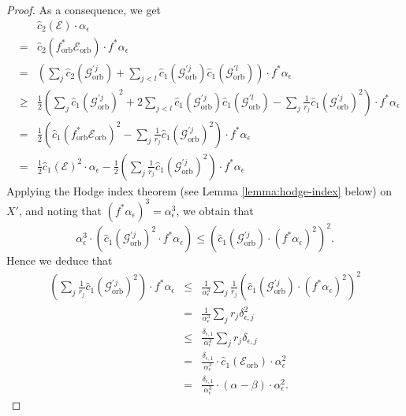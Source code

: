 \documentclass[12pt]{amsart}
\newcommand{\<}{\leq}
\def\>{\geq}
\newcommand{\num}{\equiv}
\def\mcE{\mathcal{E}}
\def\mcG{\mathcal{G}}
\theoremstyle{remark}
\theoremstyle{definition}
\theoremstyle{definition}
\numberwithin{equation}{section}
\theoremstyle{definition}
\theoremstyle{definition}
\def\orb{\mathrm{orb}}
\begin{document}
\begin{proof}
 




As a consequence, we get   
\begin{eqnarray*}
& & \hat{c}_2( \mcE ) \cdot  \alpha_\epsilon  \\
&=& \hat{c}_2(f^*_{\orb}\mcE_{\orb} ) \cdot f^*\alpha_\epsilon  \\
&=& \left(\sum_j \hat{c}_2(\mcG_{\orb}^{'j} ) + \sum_{j<l}\hat{c}_1(\mcG_{\orb}^{'j} ) \hat{c}_1(\mcG_{\orb}^{'l} ) \right)\cdot f^*\alpha_\epsilon   \\
&\> &  \frac{1}{2} \left( \sum_j \hat{c}_1(\mcG_{\orb}^{'j})^2 + 2\sum_{j<l}\hat{c}_1(\mcG_{\orb}^{'j} ) \hat{c}_1(\mcG_{\orb}^{'l} )  
-  \sum_j \frac{1}{r_j}\hat{c}_1(\mcG_{\orb}^{'j} )^2  \right) \cdot f^*\alpha_\epsilon  \\
&=&\frac{1}{2} \left(\hat{c}_1(f_{\orb}^*\mcE_{\orb})^2 -  \sum_j \frac{1}{r_j}\hat{c}_1(\mcG_{\orb}^{'j} )^2 \right) \cdot
f^*\alpha_\epsilon  \\
&=& \frac{1}{2} \hat{c}_1(\mcE)^2 \cdot \alpha_{\epsilon} 
     - \frac{1}{2}\left( \sum_j \frac{1}{r_j}\hat{c}_1(\mcG_{\orb}^{'j} )^2 \right)  
     \cdot  f^*\alpha_\epsilon 
\end{eqnarray*}
Applying the Hodge index theorem (see Lemma \ref{lemma:hodge-index} below) on  $X'$, and noting that $(f^*\alpha_\epsilon)^3= \alpha_\epsilon^3$,  we obtain that  
\[
\alpha_\epsilon^{3} \cdot \left(\hat{c}_1(\mcG_{\orb}^{'j}) ^2 \cdot f^*\alpha_\epsilon  \right) 
\<    \left(\hat{c}_1(\mcG_{\orb}^{'j}) \cdot (f^*\alpha_\epsilon)^{2}\right)^2.
\]
Hence we deduce that 
\begin{eqnarray*}
\left(\sum_j \frac{1}{r_j}\hat{c}_1(\mcG_{\orb}^{'j} )^2 \right)\cdot f^*\alpha_\epsilon 
&\<& \frac{1}{\alpha_\epsilon^3}\sum_j \frac{1}{r_j} \left(\hat{c}_1(\mcG_{\orb}^{'j}) \cdot (f^* \alpha_\epsilon)^{2}\right)^2 \\
&=& \frac{1}{\alpha_\epsilon^3} \sum_j r_j\delta_{\epsilon, j}^2 \\
&\<&   \frac{\delta_{\epsilon,1}}{\alpha_\epsilon^3} \sum_j r_j\delta_{\epsilon, j} \\
&=&  \frac{\delta_{\epsilon,1}}{\alpha_\epsilon^3} \cdot \hat{c}_1(\mcE_{\orb}) \cdot \alpha_\epsilon^{2}\\
 &=&   
 \frac{\delta_{\epsilon,1}}{\alpha_\epsilon^3} \cdot (\alpha - \beta) \cdot \alpha_\epsilon^{2}.
\end{eqnarray*}

\end{proof}
\end{document}
